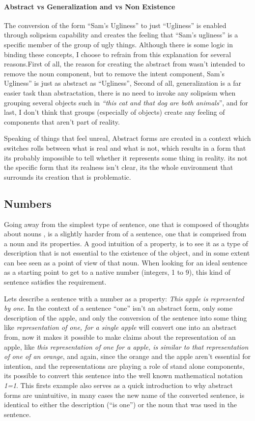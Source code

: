 \documentclass[10pt]{article}
\begin{document}
\paragraph{Abstract vs Generalization and vs Non Existence}
The conversion of the form “Sam’s Ugliness” to just “Ugliness” is enabled through  solipsism capability and creates the feeling that “Sam’s ugliness” is a specific member of the group of ugly things. Although there is some logic in binding these concepts, I choose to refrain from this explanation for several reasons.First of all, the reason for creating the abstract from wasn't intended to remove the noun component, but to remove the intent component, Sam's Ugliness” is just as abstract as “Ugliness”, Second of all, generalization is a far easier task than abstractation, there is no need to invoke any solipsism when grouping several objects such in  \textit{“this cat and that dog are both animals}”, and for last, I don’t think that  groups (especially of objects) create any feeling of components that aren't part of reality.\par
Speaking of things that feel unreal, Abstract forms are created in a context which switches rolls between what is real and what is not, which results in a form that its probably impossible to tell whether it represents some thing in reality.  its not the specific form that its realness isn’t clear, its the whole environment that surrounds its creation that is problematic. 


\subsection*{Numbers}
Going away from the simplest type of sentence, one that is  composed of thoughts about nouns , is a slightly harder from of a sentence, one that is comprised from a noun and its  properties. A good intuition of a property, is to see it as a type of description that is not essential to the existence of the object, and in some extent can bee seen as a point of view of that noun. When looking for an ideal sentence as a starting point to get to a native number (integers, 1 to 9), this kind of sentence satisfies the requirement. \par
Lets describe a sentence with a number as a property: \textit{This apple is represented by one}. In the context of a sentence “one” isn’t an abstract form, only some description of  the apple, and only the conversion of the sentence into some thing like \textit{representation of one, for a single apple} will convert one into an abstract from, now it makes it possible to  make claims about the representation of an apple,  like   \textit{this representation of one for a  apple, is similar to that representation of one of an orange}, and again, since the orange and the apple aren't essential  for intention, and the representations are playing a role of stand alone components, its possible to convert this sentence into the well known mathematical notation \textit{1=1}. This firsts example also serves as a quick introduction to why abstract forms are unintuitive, in many cases the new name of the converted sentence, is identical to  either the description (“is one”) or the noun that was used in the sentence.\par
\end{document}
